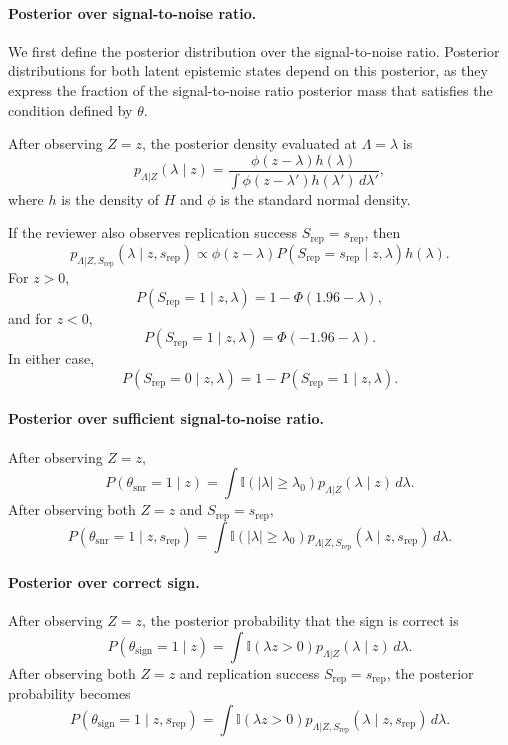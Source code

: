 \paragraph{Posterior over signal-to-noise ratio.}
We first define the posterior distribution over the signal-to-noise ratio. Posterior distributions for both latent epistemic states depend on this posterior, as they express the fraction of the signal-to-noise ratio posterior mass that satisfies the condition defined by $\theta$.


After observing $Z=z$, the posterior density evaluated at $\Lambda=\lambda$ is
\[
p_{\Lambda|Z}(\lambda \mid z)
=
\frac{\phi(z-\lambda)h(\lambda)}
{\int \phi(z-\lambda')h(\lambda')\,d\lambda'},
\]
where \(h\) is the density of \(H\) and \(\phi\) is the standard normal density.

If the reviewer also observes replication success \(S_{\mathrm{rep}}=s_{\mathrm{rep}}\), then
\[
p_{\Lambda|Z,S_{\text{rep}}}(\lambda \mid z,s_{\mathrm{rep}})
\propto
\phi(z-\lambda)
P(S_{\mathrm{rep}}=s_{\mathrm{rep}}\mid z,\lambda)
h(\lambda).
\]
For \(z>0\),
\[
P(S_{\mathrm{rep}}=1\mid z,\lambda)
=
1-\Phi(1.96-\lambda),
\]
and for \(z<0\),
\[
P(S_{\mathrm{rep}}=1\mid z,\lambda)
=
\Phi(-1.96-\lambda).
\]
In either case,
\[
P(S_{\mathrm{rep}}=0\mid z,\lambda)
=
1-P(S_{\mathrm{rep}}=1\mid z,\lambda).
\]

\paragraph{Posterior over sufficient signal-to-noise ratio.}

After observing \(Z=z\),
\[
P(\theta_{\mathrm{snr}}=1\mid z)
=
\int \mathbb{I}(|\lambda|\geq \lambda_0)p_{\Lambda|Z}(\lambda\mid z)\,d\lambda.
\]
After observing both \(Z=z\) and \(S_{\mathrm{rep}}=s_{\mathrm{rep}}\),
\[
P(\theta_{\mathrm{snr}}=1\mid z,s_{\mathrm{rep}})
=
\int \mathbb{I}(|\lambda|\geq \lambda_0)p_{\Lambda|Z,S_{\text{rep}}}(\lambda\mid z,s_{\mathrm{rep}})\,d\lambda.
\]


\paragraph{Posterior over correct sign.}
After observing \(Z=z\), the posterior probability that the sign is correct is
\[
P(\theta_{\mathrm{sign}}=1\mid z)
=
\int \mathbb{I}(\lambda z>0)p_{\Lambda|Z}(\lambda\mid z)\,d\lambda.
\]
After observing both \(Z=z\) and replication success \(S_{\mathrm{rep}}=s_{\mathrm{rep}}\), the posterior probability becomes
\[
P(\theta_{\mathrm{sign}}=1\mid z,s_{\mathrm{rep}})
=
\int \mathbb{I}(\lambda z>0)p_{\Lambda|Z,S_{\text{rep}}}(\lambda\mid z,s_{\mathrm{rep}})\,d\lambda.
\]


